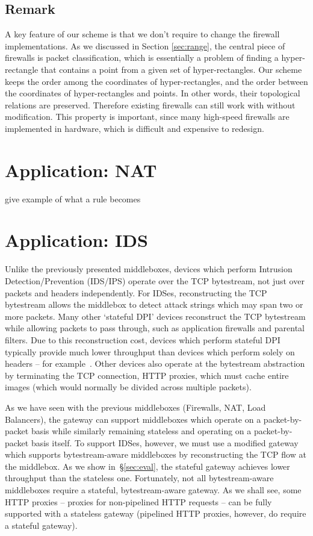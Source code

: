 \subsection{Remark}
A key feature of our scheme is that we don't require to change the firewall implementations. As we discussed in Section \ref{sec:range}, the central 
piece of firewalls is packet classification, which is essentially a problem of finding a hyper-rectangle that contains a point from a given set of hyper-rectangles. Our \RM scheme keeps the order among the coordinates of hyper-rectangles, and the order between the coordinates of hyper-rectangles and points. In other words, their topological relations are preserved. Therefore existing firewalls can still work with \sys without modification. This property is important, since many high-speed firewalls are implemented in hardware, which is difficult and expensive to redesign.

\section{Application: NAT}\label{sec:nat}

give example of what a rule becomes

\section{Application: IDS}\label{sec:ids}
Unlike the previously presented middleboxes, devices which perform Intrusion Detection/Prevention (IDS/IPS) operate over the TCP bytestream, not just over packets and headers independently.
For IDSes, reconstructing the TCP bytestream allows the middlebox to detect attack strings which may span two or more packets.
Many other `stateful DPI' devices reconstruct the TCP bytestream while allowing packets to pass through, such as application firewalls and parental filters.
Due to this reconstruction cost, devices which perform stateful DPI typically provide much lower throughput than devices which perform
solely on headers -- for example~.
Other devices also operate at the bytestream abstraction by terminating the TCP connection, \eg{} HTTP proxies, which must cache entire images (which would normally be divided across multiple packets). 

As we have seen with the previous middleboxes (Firewalls, NAT, Load Balancers), the \sys gateway can support middleboxes which operate on a packet-by-packet basis while similarly remaining stateless and operating on a packet-by-packet basis itself.
To support IDSes, however, we must use a modified gateway which supports bytestream-aware middleboxes by reconstructing the TCP flow at the middlebox.
As we show in~\S\ref{sec:eval}, the stateful gateway achieves lower throughput than the stateless one.
Fortunately, not all bytestream-aware middleboxes require a stateful, bytestream-aware gateway. 
As we shall see, some HTTP proxies -- proxies for non-pipelined HTTP requests -- can be fully supported with a stateless \sys gateway (pipelined HTTP proxies, however, do require a stateful gateway).

